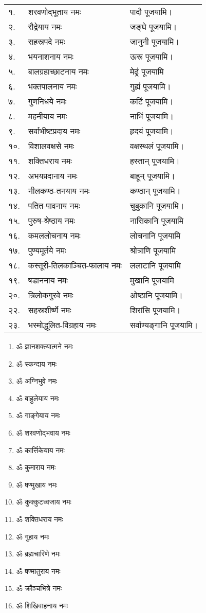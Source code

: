 \begin{center}
\begin{longtable}{ll@{— }l}
१. & शरवणोद्भूताय नमः & पादौ पूजयामि।\\
२. & रौद्रेयाय नमः & जङ्घे पूजयामि।\\
३. & सहस्रपदे नमः & जानुनी पूजयामि।\\
४. & भयनाशनाय नमः & ऊरू पूजयामि।\\
५. & बालग्रहाच्छाटनाय नमः & मेढ्रं पूजयामि \\
६. & भक्तपालनाय नमः & गुह्यं पूजयामि।\\
७. & गुणनिधये नमः & कटिं पूजयामि।\\
८. & महनीयाय नमः & नाभिं पूजयामि।\\
९. & सर्वाभीष्टप्रदाय नमः & हृदयं पूजयामि।\\
१०. & विशालवक्षसे नमः & वक्षस्थलं पूजयामि।\\
११. & शक्तिधराय नमः & हस्तान् पूजयामि।\\
१२. & अभयप्रदानाय नमः & बाहून् पूजयामि।\\
१३. & नीलकण्ठ-तनयाय नमः & कण्ठान् पूजयामि।\\
१४. & पतित-पावनाय नमः & चुबुकानि पूजयामि।\\
१५. & पुरुष-श्रेष्ठाय नमः & नासिकानि पूजयामि\\
१६. & कमललोचनाय नमः & लोचनानि पूजयामि\\
१७. & पुण्यमूर्तये नमः & श्रोत्राणि पूजयामि\\
१८. & कस्तूरी-तिलकाञ्चित-फालाय नमः & ललाटानि पूजयामि\\
१९. & षडाननाय नमः & मुखानि पूजयामि\\
२०. & त्रिलोकगुरवे नमः & ओष्ठानि पूजयामि।\\
२२. & सहस्रशीर्ष्णे नमः & शिरांसि पूजयामि।\\
२३. &भस्मोद्धूलित-विग्रहाय नमः & सर्वाण्यङ्गानि पूजयामि। \\
\end{longtable}

\begin{multicols}{2}
\begin{enumerate}
\item ॐ ज्ञानशक्त्यात्मने नमः
\item ॐ स्कन्दाय नमः
\item ॐ अग्निभुवे नमः
\item ॐ बाहुलेयाय नमः
\item ॐ गाङ्गेयाय नमः
\item ॐ शरवणोद्भवाय नमः
\item ॐ कार्त्तिकेयाय नमः
\item ॐ कुमाराय नमः
\item ॐ षण्मुखाय नमः
\item ॐ कुक्कुटध्वजाय नमः
\item ॐ शक्तिधराय नमः
\item ॐ गुहाय नमः
\item ॐ ब्रह्मचारिणे नमः
\item ॐ षण्मातुराय नमः
\item ॐ क्रौञ्चभित्रे नमः
\item ॐ शिखिवाहनाय नमः
\end{enumerate}
\end{multicols}


\end{center}
